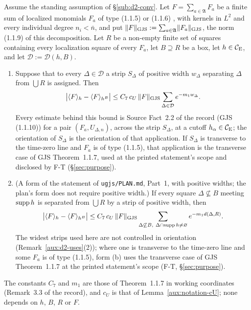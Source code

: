 \begin{dlemma}\label{lem:D2}
Assume the standing assumption of \S\ref{sub:d2-conv}.  Let $F=\sum_{a\in\mathfrak A}F_a$ be a
finite sum of localized monomials $F_a$ of type (1.1.5) or (1.1.6) \cite[p.~593]{GJS}, with
kernels in $L^2$ and every individual degree $n_i<\bar n$, and put
$\lVert F\rVert_{\mathrm{GJS}}:=\sum_{a\in\mathfrak A}\lVert F_a\rVert_{\mathrm{GJS}}$, the norm (1.1.9) of this decomposition.  Let $R$
be a non-empty finite set of squares containing every localization square of every $F_a$, let
$B\supseteq R$ be a box, let $h\in\mathcal{C}_{\mathrm E}$, and let $\mathcal D:=\mathcal D(h,B)$.
\begin{enumerate}
\item[\rm(a)] Suppose that to every $\Delta\in\mathcal D$ a strip $S_\Delta$ of positive width
$w_\Delta$ separating $\Delta$ from $\bigcup R$ is assigned.  Then
\[
 \bigl|\langle F\rangle_{h}-\langle F\rangle_{h^B}\bigr|\le C_7\,c_U\,\lVert F\rVert_{\mathrm{GJS}}\sum_{\Delta\in\mathcal D}e^{-m_1w_\Delta} .
\]
Every estimate behind this bound is Source Fact~2.2 of the record (GJS (1.1.10)) for a pair
$(F_a,U_{\Delta,n})$, across the strip $S_\Delta$, at a cutoff $h_\alpha\in\mathcal{C}_{\mathrm E}$; the
orientation of $S_\Delta$ is the orientation of that application.  If $S_\Delta$ is transverse
to the time-zero line and $F_a$ is of type (1.1.5), that application is the transverse case of
GJS Theorem~1.1.7, used at the printed statement's scope and disclosed by F-T
(\S\ref{sec:purpose}).
\item[\rm(b)] (A form of the statement of \texttt{ugjs/PLAN.md}, Part~1, with positive widths;
the plan's form does not require positive width.)  If every square $\Delta\not\subseteq B$
meeting $\operatorname{supp} h$ is separated from $\bigcup R$ by a strip of positive width, then
\[
 \bigl|\langle F\rangle_{h}-\langle F\rangle_{h^B}\bigr|\le C_7\,c_U\,\lVert F\rVert_{\mathrm{GJS}}
 \sum_{\Delta\not\subseteq B,\ \Delta\cap\operatorname{supp} h\ne\varnothing}e^{-m_1d(\Delta,R)} .
\]
The widest strips used here are not controlled in orientation
(Remark~\ref{aux:d2-uses}(2)); where one is transverse to the time-zero line and some $F_a$
is of type (1.1.5), form (b) uses the transverse case of GJS Theorem~1.1.7 at the printed
statement's scope (F-T, \S\ref{sec:purpose}).
\end{enumerate}
The constants $C_7$ and $m_1$ are those of Theorem~1.1.7 in working coordinates (Remark~3.3 of
the record), and $c_U$ is that of Lemma~\ref{aux:notation-cU}; none depends on $h$, $B$, $R$ or
$F$.
\end{dlemma}

